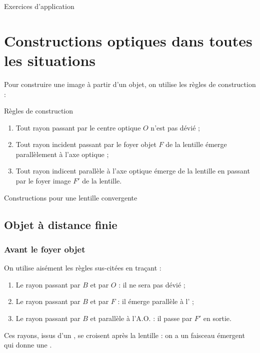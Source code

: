 \documentclass[10pt,a5paper,notitlepage]{book}
\begin{document}
\begin{center}
    \Huge Exercices d'application
\end{center}

\section{Constructions optiques dans toutes les situations}
Pour construire une image à partir d'un objet, on utilise les règles de
construction :

\begin{defi}[label = rconst]{Règles de construction}
    \begin{enumerate}
        \item Tout rayon passant par le centre optique $O$ n'est pas dévié ;
        \item Tout rayon incident passant par le foyer objet $F$ de la lentille
            émerge parallèlement à l'axe optique ;
        \item Tout rayon indicent parallèle à l'axe optique émerge de la
            lentille en passant par le foyer image $F'$ de la lentille.
    \end{enumerate}
\end{defi}

\pagebreak

\begin{center}
    \huge Constructions pour une lentille convergente
\end{center}

\subsection{Objet à distance finie}
\subsubsection{Avant le foyer objet}
On utilise aisément les règles sus-citées en traçant :
\begin{enumerate}
    \item Le rayon passant par $B$ et par $O$ : il ne sera pas dévié ;
    \item Le rayon passant par $B$ et par $F$ : il émerge parallèle à
        l' ;
    \item Le rayon passant par $B$ et parallèle à l'A.O. : il passe par $F'$ en
        sortie.
\end{enumerate}
Ces rayons, issus d'un , se croisent après la
        lentille : on a un faisceau émergent  qui donne une .
\end{document}
